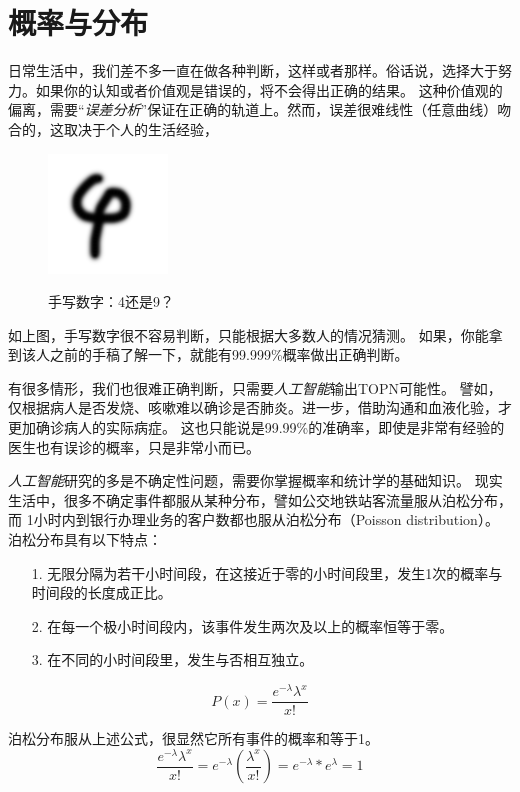 \chapter{概率与分布}
\label{chap:regression}

日常生活中，我们差不多一直在做各种判断，这样或者那样。俗话说，选择大于努力。如果你的认知或者价值观是错误的，将不会得出正确的结果。
这种价值观的偏离，需要“\emph{误差分析}”保证在正确的轨道上。然而，误差很难线性（任意曲线）吻合的，这取决于个人的生活经验，

\begin{figure}[!htb]
\centerline{\includegraphics[width=.1\figwidth]{images/4or9.png}}
\centerline{手写数字：4还是9？}
\end{figure}

如上图，手写数字很不容易判断，只能根据大多数人的情况猜测。
如果，你能拿到该人之前的手稿了解一下，就能有99.999\%概率做出正确判断。

有很多情形，我们也很难正确判断，只需要\emph{人工智能}输出TOPN可能性。
譬如，仅根据病人是否发烧、咳嗽难以确诊是否肺炎。进一步，借助沟通和血液化验，才更加确诊病人的实际病症。
这也只能说是99.99\%的准确率，即使是非常有经验的医生也有误诊的概率，只是非常小而已。

\emph{人工智能}研究的多是不确定性问题，需要你掌握概率和统计学的基础知识。
现实生活中，很多不确定事件都服从某种分布，譬如公交地铁站客流量服从泊松分布，而
1小时内到银行办理业务的客户数都也服从泊松分布（Poisson distribution）。
泊松分布具有以下特点：
\begin{itemize}
\item[1.] 无限分隔为若干小时间段，在这接近于零的小时间段里，发生1次的概率与时间段的长度成正比。
\item[2.] 在每一个极小时间段内，该事件发生两次及以上的概率恒等于零。
\item[3.] 在不同的小时间段里，发生与否相互独立。
\end{itemize}
\vspace{0.3cm}
\begin{equation*}
P\left( x \right) = \frac{{e^{ - \lambda } \lambda ^x }}{{x!}}
\end{equation*}

\noindent
泊松分布服从上述公式，很显然它所有事件的概率和等于1。
\begin{equation*}
\frac{{e^{-\lambda}\lambda^x }}{{x!}}
=e^{-\lambda }\left( \frac{{ \lambda ^x }}{{x!}}\right)
=e^{-\lambda } * e^\lambda
=1
\end{equation*}

